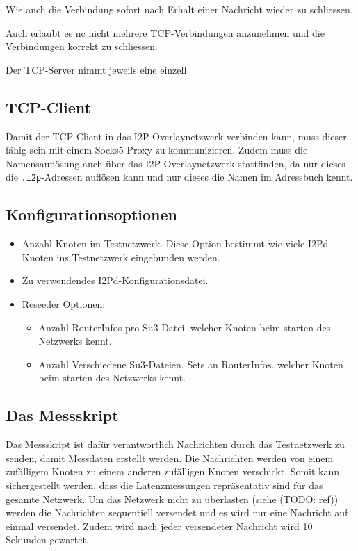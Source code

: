 Wie auch die Verbindung sofort nach Erhalt einer Nachricht wieder zu schliessen.

Auch erlaubt es nc nicht mehrere TCP-Verbindungen anzunehmen und die Verbindungen korrekt zu schliessen.

Der TCP-Server nimmt jeweils eine einzell


\subsection{TCP-Client}

Damit der TCP-Client in das I2P-Overlaynetzwerk verbinden kann, muss dieser fähig sein mit einem Socks5-Proxy zu kommunizieren.
Zudem muss die Namensauflösung auch über das I2P-Overlaynetzwerk stattfinden, da nur dieses die \lstinline|.i2p|-Adressen auflösen kann und nur dieses die Namen im Adressbuch kennt.


\subsection{Konfigurationsoptionen}

\begin{itemize}
    \item Anzahl Knoten im Testnetzwerk. Diese Option bestimmt wie viele I2Pd-Knoten ins Testnetzwerk eingebunden werden.
    \item Zu verwendendes I2Pd-Konfigurationsdatei.
    \item Reseeder Optionen:
        \begin{itemize}
        \item Anzahl RouterInfos pro Su3-Datei. welcher Knoten beim starten des Netzwerks kennt.
        \item Anzahl Verschiedene Su3-Dateien. Sets an RouterInfos. welcher Knoten beim starten des Netzwerks kennt.
        \end{itemize}
\end{itemize}

\subsection{Das Messskript}\label{sec:messskript}

Das Messskript ist dafür verantwortlich Nachrichten durch das Testnetzwerk zu senden, damit Messdaten erstellt werden.
Die Nachrichten werden von einem zufälligem Knoten zu einem anderen zufälligen Knoten verschickt.
Somit kann sichergestellt werden, dass die Latenzmessungen repräsentativ sind für das gesamte Netzwerk.
Um das Netzwerk nicht zu überlasten (siehe (TODO: ref)) werden die Nachrichten sequentiell versendet und es wird nur eine Nachricht auf einmal versendet.
Zudem wird nach jeder versendeter Nachricht wird 10 Sekunden gewartet.

